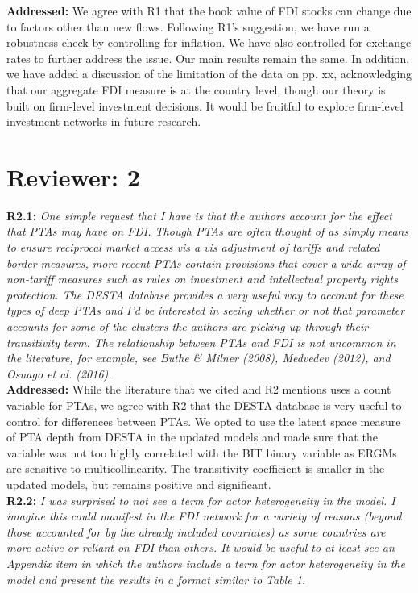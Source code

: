 \documentclass[a4paper,11pt]{texMemo}
\begin{document}
\noindent \textbf{Addressed:} We agree with R1 that the book value of FDI stocks can change due to factors other than new flows. Following R1's suggestion, we have run a robustness check by controlling for inflation. We have also controlled for exchange rates to further address the issue. Our main results remain the same. In addition, we have added a discussion of the limitation of the data on pp. xx, acknowledging that our aggregate FDI measure is at the country level, though our theory is built on firm-level investment decisions. It would be fruitful to explore firm-level investment networks in future research.  \\

\section*{Reviewer: 2}


\noindent \textbf{R2.1:} \emph{One simple request that I have is that the authors account for the effect that PTAs may have on FDI. Though PTAs are often thought of as simply means to ensure reciprocal market access vis a vis adjustment of tariffs and related border measures, more recent PTAs contain provisions that cover a wide array of non-tariff measures such as rules on investment and intellectual property rights protection. The DESTA database provides a very useful way to account for these types of deep PTAs and I'd be interested in seeing whether or not that parameter accounts for some of the clusters the authors are picking up through their transitivity term. The relationship between PTAs and FDI is not uncommon in the literature, for example, see Buthe \& Milner (2008), Medvedev (2012), and Osnago et al. (2016).}\\

\noindent \textbf{Addressed:} While the literature that we cited and R2 mentions uses a count variable for PTAs, we agree with R2 that the DESTA database is very useful to control for differences between PTAs. We opted to use the latent space measure of PTA depth from DESTA  in the updated models and made sure that the variable was not too highly correlated with the BIT binary variable as ERGMs are sensitive to multicollinearity. The transitivity coefficient is smaller in the updated models, but remains positive and significant. \\

\noindent \textbf{R2.2:} \emph{I was surprised to not see a term for actor heterogeneity in the model. I imagine this could manifest in the FDI network for a variety of reasons (beyond those accounted for by the already included covariates) as some countries are more active or reliant on FDI than others. It would be useful to at least see an Appendix item in which the authors include a term for actor heterogeneity in the model and present the results in a format similar to Table 1.}\\
\end{document}
